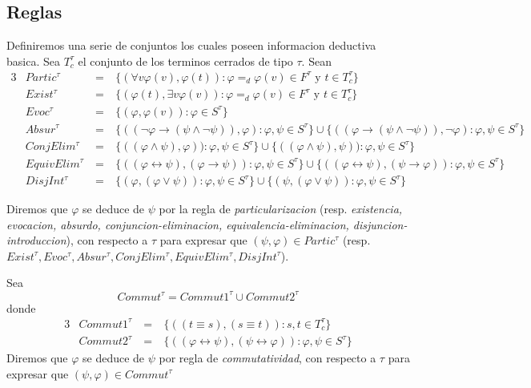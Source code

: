 \subsection{Reglas}
\begin{definition}
  Definiremos una serie de conjuntos los cuales poseen informacion deductiva basica.
  Sea $T_c^\tau$ el conjunto de los terminos cerrados de tipo $\tau$.
  Sean
  \begin{alignat}{3}
    &Partic^\tau &\ =&\ \{(\forall v\varphi(v),\varphi(t)): \varphi =_d\varphi(v)\in F^\tau \text{ y } t\in T_c^\tau\}\\
    &Exist^\tau &\ =&\ \{(\varphi(t),\exists v\varphi(v)): \varphi =_d\varphi(v)\in F^\tau \text{ y } t\in T_c^\tau\}\\    
    &Evoc^\tau &\ =&\ \{(\varphi,\varphi(v)): \varphi\in S^\tau\}\\    
    &Absur^\tau &\ =&\ \{((\neg\varphi\rightarrow(\psi\land\neg\psi)),\varphi): \varphi,\psi \in S^\tau\}\cup\{((\varphi\rightarrow(\psi\land\neg\psi)),\neg\varphi): \varphi,\psi \in S^\tau\}\\
    &ConjElim^\tau &\ =&\ \{((\varphi\land\psi),\varphi)):\varphi,\psi\in S^\tau\}\cup\{((\varphi\land\psi),\psi)):\varphi,\psi\in S^\tau\}\\
    &EquivElim^\tau &\ =&\ \{((\varphi\leftrightarrow\psi),(\varphi\rightarrow\psi)):\varphi,\psi\in S^\tau\}\cup\{((\varphi\leftrightarrow\psi),(\psi\rightarrow\varphi)):\varphi,\psi\in S^\tau\}\\
    &DisjInt^\tau &\ =&\ \{(\varphi, (\varphi\lor\psi)):\varphi,\psi\in S^\tau\}\cup\{(\psi, (\varphi\lor\psi)):\varphi,\psi\in S^\tau\}
  \end{alignat}

  Diremos que $\varphi$ se deduce de $\psi$ por la regla de \emph{particularizacion} (resp. \emph{existencia, evocacion,
  absurdo, conjuncion-eliminacion, equivalencia-eliminacion, disjuncion-introduccion}), con respecto a $\tau$ para expresar que
  $(\psi,\varphi)\in Partic^\tau$ (resp. $Exist^\tau,Evoc^\tau,Absur^\tau,ConjElim^\tau,EquivElim^\tau,DisjInt^\tau$).

  Sea
  $$
  Commut^\tau = Commut1^\tau \cup Commut2^\tau
  $$
  donde 
  \begin{alignat*}{3}
    &Commut1^\tau &\ =&\ \{((t\equiv s), (s\equiv t)):s,t\in T_c^\tau\}\\
    &Commut2^\tau &\ =&\ \{((\varphi\leftrightarrow\psi), (\psi\leftrightarrow\varphi)):\varphi,\psi\in S^\tau\}    
  \end{alignat*}
  Diremos que $\varphi$ se deduce de $\psi$ por regla de \emph{commutatividad}, con respecto a $\tau$
  para expresar que $(\psi,\varphi)\in Commut^\tau$


\end{definition}
